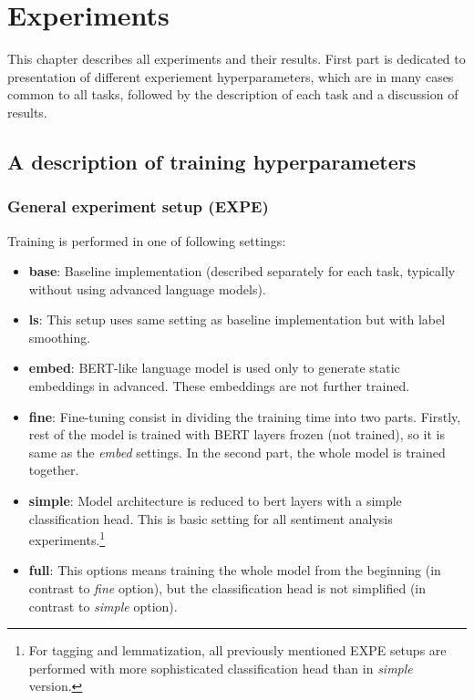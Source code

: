 \chapter{Experiments}
\label{chap:exp}
This chapter describes all experiments and their results. First part is dedicated to presentation of different experiement hyperparameters, which are in many cases common to all tasks, followed by the description of each task and a discussion of results.
\section{A description of training hyperparameters}
\label{sec:expe}
\subsection{General experiment setup (EXPE)}
Training is performed in one of following settings:
\begin{itemize}
\item \textbf{base}: Baseline implementation (described separately for each task, typically without using advanced language models).
\item \textbf{ls}: This setup uses same setting as baseline implementation but with label smoothing.
\item \textbf{embed}: BERT-like language model is used only to generate static embeddings in advanced. These embeddings are not further trained.
\item \textbf{fine}: Fine-tuning consist in dividing the training time into two parts. Firstly, rest of the model is trained with BERT layers frozen (not trained), so it is same as the \textit{embed} settings. In the second part, the whole model is trained together.
\item \textbf{simple}: Model architecture is reduced to bert layers with a simple classification head. This is basic setting for all sentiment analysis experiments.\footnote{For tagging and lemmatization, all previously mentioned EXPE setups are performed with more sophisticated classification head than in \textit{simple} version.} 
\item \textbf{full}: This options means training the whole model from the beginning (in contrast to \textit{fine} option), but the classification head is not simplified (in contrast to \textit{simple} option).
\end{itemize}
